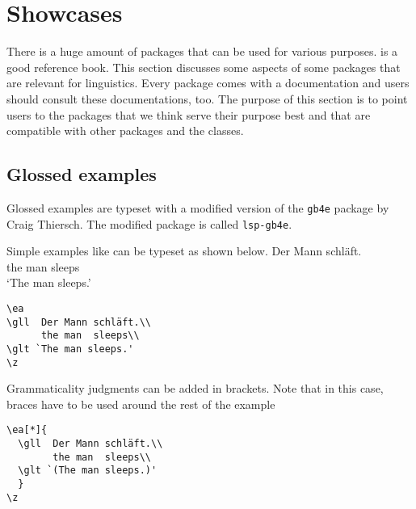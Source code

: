 \chapter{Showcases}

There is a huge amount of packages that can be used for various purposes. \citet{MG2013a} is a good
reference book. This section discusses some aspects of some packages that are relevant for
linguistics. Every \latex package comes with a documentation and users should consult these
documentations, too. The purpose of this section is to point users to the packages that we think
serve their purpose best and that are compatible with other packages and the \lsp classes.

\section{Glossed examples}

Glossed examples are typeset with a modified version of the \texttt{gb4e} package by Craig
Thiersch. The modified package is called \texttt{lsp-gb4e}. 

Simple examples like  can be typeset as shown below.
\ea\label{ex:showcases:simple} 
\gll Der Mann schläft.\\
     the man  sleeps\\
\glt `The man sleeps.'
\z
\begin{verbatim}
\ea
\gll  Der Mann schläft.\\
      the man  sleeps\\
\glt `The man sleeps.'
\z
\end{verbatim}

Grammaticality judgments can be added in brackets. Note that in this case, braces have to be used around the rest of the example
\z
 
\newpage
\begin{verbatim}
\ea[*]{
  \gll  Der Mann schläft.\\
        the man  sleeps\\
  \glt `(The man sleeps.)'
  }
\z
\end{verbatim} 

